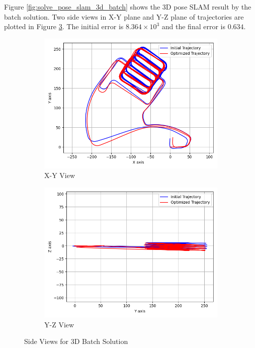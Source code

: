 \documentclass[11pt, oneside, letter]{article}
\begin{document}
\begin{enumerate}[A.]
Figure \ref{fig:solve_pose_slam_3d_batch} shows the 3D pose SLAM result by the batch solution. 
Two side views in X-Y plane and Y-Z plane of trajectories are plotted in Figure \ref{fig:solve_pose_slam_3d_batch_view}. 
The initial error is $8.364\times 10^3$ and the final error is $0.634$.

\begin{figure}[H]
    \centering
    \begin{subfigure}[b]{0.45\columnwidth}
        \centering
        \includegraphics[width=\columnwidth]{../figures/solve_pose_slam_3d_batch_x_y.png}
        \caption{X-Y View}
        \label{fig:solve_pose_slam_3d_batch_x_y}
    \end{subfigure}
    \begin{subfigure}[b]{0.45\columnwidth}
        \centering
        \includegraphics[width=\columnwidth]{../figures/solve_pose_slam_3d_batch_y_z.png}
        \caption{Y-Z View}
        \label{fig:solve_pose_slam_3d_batch_y_z}
    \end{subfigure}
    \caption{Side Views for 3D Batch Solution}
    \label{fig:solve_pose_slam_3d_batch_view}
\end{figure}


\end{enumerate}
\end{document}
